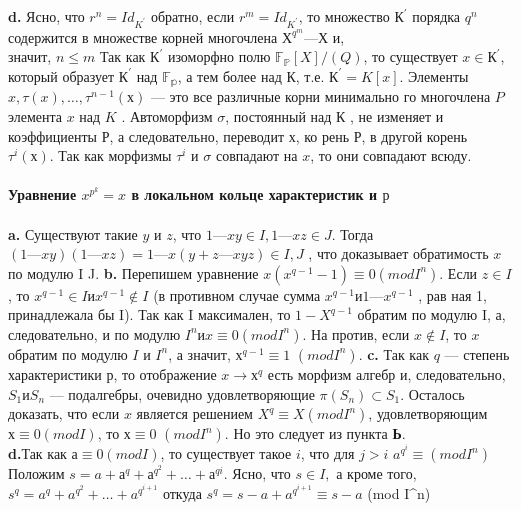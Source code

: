\documentclass{../../template/mai_book}
\begin{document}
{{\hspace*{15pt}\textbf{d.} Ясно, что $r^{n} = Id_{K^{'}}$ обратно, если $r^{m} = Id_{K^{'}}$, то множество\linebreak
$К^{'}$ порядка $q^{n}$ содержится в множестве корней многочлена $Х^{q^{m}} — Х$ и,\\
\newpage
\noindent значит, $n \leq m$ Так как $К^{'}$ изоморфно полю $\mathbb{F_P}[X]/(Q)$, то существует
$x \in К^{'}$, который образует $К^{'}$ над $\mathbb{F_p}$, а тем более над К, т.е. $К^{'} = K[x].$
Элементы $x, \tau(x),\ldots,\tau^{n-1}(х)$ --- это все различные корни минимально­
го многочлена $P$ элемента $x$ над $K$ . Автоморфизм $\sigma$, постоянный над
$К$ , не изменяет и коэффициенты $Р$, а следовательно, переводит $х$, ко­
рень $Р$, в другой корень $\tau^{i}(х)$. Так как морфизмы $\tau^{i}$ и $\sigma$ совпадают на
$x$, то они совпадают всюду.\\
\\
\noindent\textbf{Уравнение $x^{p^{k}} = x$ в локальном кольце характеристик и $р$}\\
\\
\hspace*{15pt}\textbf{a.} Существуют такие $y$ и $z$, что $1 — xy \in I, 1 — xz \in J.$ Тогда
$(1 — xy)(1 — xz) = 1 — x(y + z — xyz) \in I,J$ , что доказывает обратимость
$x$ по модулю I J.
\hspace*{15pt}\textbf{b.} Перепишем уравнение $x(x^{q-1} - 1) \equiv 0 (mod I^{n})$. Если $z \in I$, то
$x^{q-1} \in I и x^{q-1} \notin I$ (в противном случае сумма $x^{q-1} и 1 — x^{q-1}$ , рав­
ная 1, принадлежала бы I). Так как I максимален, то $1 - X^{q-1}$ обратим
по модулю I, а, следовательно, и по модулю $I^{n} и x \equiv 0 (mod I^{n})$. На­
против, если $x \notin I$, то $x$ обратим по модулю $I$ и $I^{n}$, а значит, $х^{q-1} \equiv 1$
$(mod I^{n})$.
\hspace*{15pt}\textbf{c.} Так как $q$ --- степень характеристики $р$, то отображение $x \rightarrow х^{q}$
есть морфизм алгебр и, следовательно, $S_1 и S_n$ --- подалгебры, очевидно
удовлетворяющие $\pi(S_n) \subset S_1$. Осталось доказать, что если $x$ является
решением $X^{q} \equiv X (mod I^{n})$, удовлетворяющим $х \equiv 0 (mod I)$, то $х \equiv 0$
$(mod I^{n})$. Но это следует из пункта \textbf{Ь}.\\
\hspace*{15pt}\textbf{d.}Так как $а \equiv 0 (mod I)$, то существует такое $i$, что для $j > i$
$a^{q^{i}} \equiv (mod I^{n})$ Положим $s = a + а^{q} + а^{q^{2}} +\ldots+ а^{q{i}}$. Ясно, что $s \in I,$
а кроме того, $s^{q} = a^{q}+ a^{q^{2}} +\ldots+ a^{q^{i+1}}$ откуда $s^{q} = s - a + a^{q^{i+1}} \equiv s - a$
(mod I^{n})\\

}}
\end{document}
